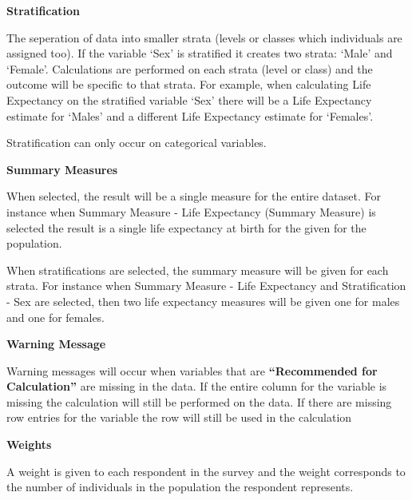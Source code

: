 \documentclass[]{book}
\begin{document}
\textbf{Stratification}

The seperation of data into smaller strata (levels or
classes which individuals are assigned too). If the variable `Sex' is
stratified it creates two strata: `Male' and `Female'. Calculations are
performed on each strata (level or class) and the outcome will be
specific to that strata. For example, when calculating Life Expectancy
on the stratified variable `Sex' there will be a Life Expectancy
estimate for `Males' and a different Life Expectancy estimate for
`Females'.

Stratification can only occur on categorical variables.

\textbf{Summary Measures}

When selected, the result will be a single measure for
the entire dataset. For instance when Summary Measure - Life Expectancy
(Summary Measure) is selected the result is a single life expectancy at
birth for the given for the population.

When stratifications are selected, the summary
measure will be given for each strata. For instance when Summary Measure
- Life Expectancy and Stratification - Sex are selected, then two life
expectancy measures will be given one for males and one for females.

\textbf{Warning Message}

Warning messages will occur when variables that are
\textbf{``Recommended for Calculation''} are missing in the data. If the
entire column for the variable is missing the calculation will still be
performed on the data. If there are missing row entries for the variable
the row will still be used in the calculation

\textbf{Weights}

A weight is given to each respondent in the survey and the weight
corresponds to the number of individuals in the population the
respondent represents.
\end{document}
